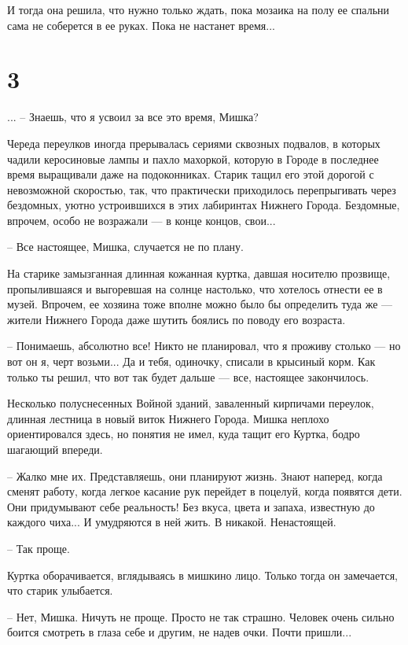 \documentclass[a5paper]{article}
\begin{document}
И тогда она решила, что нужно только ждать, пока мозаика на полу ее спальни сама не соберется в ее руках. Пока не настанет время...

\section*{3}

... -- Знаешь, что я усвоил за все это время, Мишка?

Череда переулков иногда прерывалась сериями сквозных подвалов, в которых чадили керосиновые лампы и пахло махоркой, которую в Городе в последнее время выращивали даже на подоконниках. Старик тащил его этой дорогой с невозможной скоростью, так, что практически приходилось перепрыгивать через бездомных, уютно устроившихся в этих лабиринтах Нижнего Города. Бездомные, впрочем, особо не возражали --- в конце концов, свои...

-- Все настоящее, Мишка, случается не по плану.

На старике замызганная длинная кожанная куртка, давшая носителю прозвище, пропылившаяся и выгоревшая на солнце настолько, что хотелось отнести ее в музей. Впрочем, ее хозяина тоже вполне можно было бы определить туда же --- жители Нижнего Города даже шутить боялись по поводу его возраста.

-- Понимаешь, абсолютно все! Никто не планировал, что я проживу столько --- но вот он я, черт возьми... Да и тебя, одиночку, списали в крысиный корм. Как только ты решил, что вот так будет дальше --- все, настоящее закончилось.

Несколько полуснесенных Войной зданий, заваленный кирпичами переулок, длинная лестница в новый виток Нижнего Города. Мишка неплохо ориентировался здесь, но понятия не имел, куда тащит его Куртка, бодро шагающий впереди.

-- Жалко мне их. Представляешь, они планируют жизнь. Знают наперед, когда сменят работу, когда легкое касание рук перейдет в поцелуй, когда появятся дети. Они придумывают себе реальность! Без вкуса, цвета и запаха, известную до каждого чиха... И умудряются в ней жить. В никакой. Ненастоящей.

-- Так проще.

Куртка оборачивается, вглядываясь в мишкино лицо. Только тогда он замечается, что старик улыбается.

-- Нет, Мишка. Ничуть не проще. Просто не так страшно. Человек очень сильно боится смотреть в глаза себе и другим, не надев очки. Почти пришли...
\end{document}

